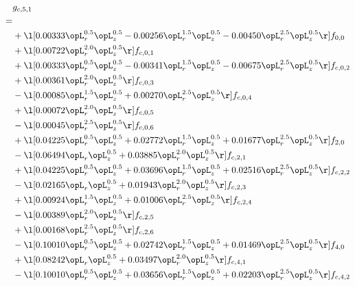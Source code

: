 \begin{alignat}{2} 
\label{eq:g_51_0} 
& g_{c,5,1} \nonumber \\ 
 = \\ 
& + \l[  0.00333 \opL_r^{0.5} \opL_z^{0.5}   -0.00256 \opL_r^{1.5} \opL_z^{0.5}   -0.00450 \opL_r^{2.5} \opL_z^{0.5}  \r] f_{0,0} \nonumber \\ 
& + \l[  0.00722 \opL_r^{2.0} \opL_z^{0.5}  \r] f_{c,0,1} \nonumber \\ 
& + \l[  0.00333 \opL_r^{0.5} \opL_z^{0.5}   -0.00341 \opL_r^{1.5} \opL_z^{0.5}   -0.00675 \opL_r^{2.5} \opL_z^{0.5}  \r] f_{c,0,2} \nonumber \\ 
& + \l[  0.00361 \opL_r^{2.0} \opL_z^{0.5}  \r] f_{c,0,3} \nonumber \\ 
& - \l[  0.00085 \opL_r^{1.5} \opL_z^{0.5} +  0.00270 \opL_r^{2.5} \opL_z^{0.5}  \r] f_{c,0,4} \nonumber \\ 
& + \l[  0.00072 \opL_r^{2.0} \opL_z^{0.5}  \r] f_{c,0,5} \nonumber \\ 
& - \l[  0.00045 \opL_r^{2.5} \opL_z^{0.5}  \r] f_{c,0,6} \nonumber \\ 
& + \l[  0.04225 \opL_r^{0.5} \opL_z^{0.5} +  0.02772 \opL_r^{1.5} \opL_z^{0.5} +  0.01677 \opL_r^{2.5} \opL_z^{0.5}  \r] f_{2,0} \nonumber \\ 
& - \l[  0.06494 \opL_r \opL_z^{0.5} +  0.03885 \opL_r^{2.0} \opL_z^{0.5}  \r] f_{c,2,1} \nonumber \\ 
& + \l[  0.04225 \opL_r^{0.5} \opL_z^{0.5} +  0.03696 \opL_r^{1.5} \opL_z^{0.5} +  0.02516 \opL_r^{2.5} \opL_z^{0.5}  \r] f_{c,2,2} \nonumber \\ 
& - \l[  0.02165 \opL_r \opL_z^{0.5} +  0.01943 \opL_r^{2.0} \opL_z^{0.5}  \r] f_{c,2,3} \nonumber \\ 
& + \l[  0.00924 \opL_r^{1.5} \opL_z^{0.5} +  0.01006 \opL_r^{2.5} \opL_z^{0.5}  \r] f_{c,2,4} \nonumber \\ 
& - \l[  0.00389 \opL_r^{2.0} \opL_z^{0.5}  \r] f_{c,2,5} \nonumber \\ 
& + \l[  0.00168 \opL_r^{2.5} \opL_z^{0.5}  \r] f_{c,2,6} \nonumber \\ 
& - \l[  0.10010 \opL_r^{0.5} \opL_z^{0.5} +  0.02742 \opL_r^{1.5} \opL_z^{0.5} +  0.01469 \opL_r^{2.5} \opL_z^{0.5}  \r] f_{4,0} \nonumber \\ 
& + \l[  0.08242 \opL_r \opL_z^{0.5} +  0.03497 \opL_r^{2.0} \opL_z^{0.5}  \r] f_{c,4,1} \nonumber \\ 
& - \l[  0.10010 \opL_r^{0.5} \opL_z^{0.5} +  0.03656 \opL_r^{1.5} \opL_z^{0.5} +  0.02203 \opL_r^{2.5} \opL_z^{0.5}  \r] f_{c,4,2} \nonumber \\ 

\end{alignat}
